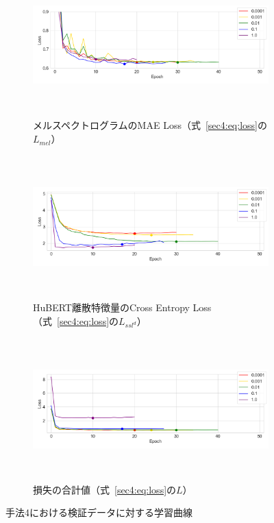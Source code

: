\documentclass[12pt]{jarticle}
\numberwithin{equation}{section}    %
\numberwithin{figure}{section}      %
\numberwithin{table}{section}      %
\begin{document}
\begin{figure}[bt]
    \centering
    \begin{subfigure}{\linewidth}
        \centering
        \includegraphics[height=55mm]{./figure/sec4/learning_curve/impact_of_loss_weights_across_methods/4/mel_loss.png}
        \caption{メルスペクトログラムのMAE Loss（式~\eqref{sec4:eq:loss}の$L_{mel}$）}
        \label{sec4:fig:learning_curve_method_4_val_mel_loss}
    \end{subfigure}
    \begin{subfigure}{\linewidth}
        \centering
        \includegraphics[height=55mm]{./figure/sec4/learning_curve/impact_of_loss_weights_across_methods/4/ssl_feature_cluster_loss.png}
        \caption{HuBERT離散特徴量のCross Entropy Loss（式~\eqref{sec4:eq:loss}の$L_{ssl^{d}}$）}
        \label{sec4:fig:learning_curve_method_4_val_ssl_feature_cluster_loss}
    \end{subfigure}
    \begin{subfigure}{\linewidth}
        \centering
        \includegraphics[height=55mm]{./figure/sec4/learning_curve/impact_of_loss_weights_across_methods/4/total_loss.png}
        \caption{損失の合計値（式~\eqref{sec4:eq:loss}の$L$）}
        \label{sec4:fig:learning_curve_method_4_val_total_loss}
    \end{subfigure}
    \caption{手法4における検証データに対する学習曲線}
    \label{sec4:fig:learning_curve_method_4_val_losses}
\end{figure}
\end{document}
